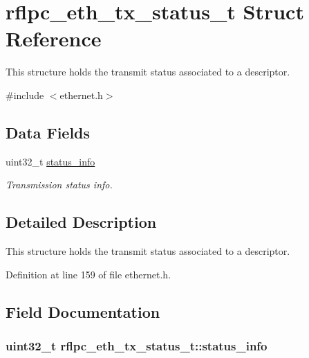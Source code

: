 \hypertarget{structrflpc__eth__tx__status__t}{\section{rflpc\-\_\-eth\-\_\-tx\-\_\-status\-\_\-t Struct Reference}
\label{structrflpc__eth__tx__status__t}
}


This structure holds the transmit status associated to a descriptor.  




{\ttfamily \#include $<$ethernet.\-h$>$}

\subsection*{Data Fields}
\begin{DoxyCompactItemize}
\item 
uint32\-\_\-t \hyperlink{structrflpc__eth__tx__status__t_a5d75e6895fd2c1fcd82972bd2b044d20}{status\-\_\-info}
\begin{DoxyCompactList}\small\item\em Transmission status info. \end{DoxyCompactList}\end{DoxyCompactItemize}


\subsection{Detailed Description}
This structure holds the transmit status associated to a descriptor. 

Definition at line 159 of file ethernet.\-h.



\subsection{Field Documentation}
\hypertarget{structrflpc__eth__tx__status__t_a5d75e6895fd2c1fcd82972bd2b044d20}{
\subsubsection[{status\-\_\-info}]{\setlength{\rightskip}{0pt plus 5cm}uint32\-\_\-t {\bf rflpc\-\_\-eth\-\_\-tx\-\_\-status\-\_\-t\-::status\-\_\-info}}}\label{structrflpc__eth__tx__status__t_a5d75e6895fd2c1fcd82972bd2b044d20}


